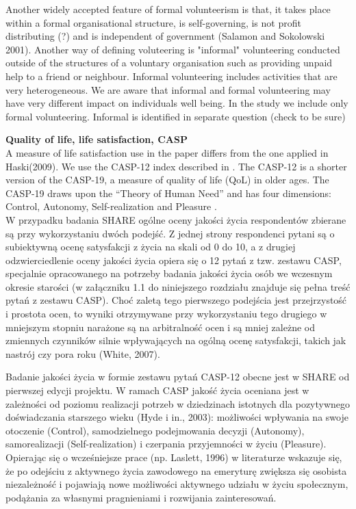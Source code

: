\documentclass[10pt, letterpaper]{article}
\begin{document}
\begin{spacing}{1.4}
Another widely accepted feature of formal volunteerism is that, it takes place within a formal organisational structure, is self-governing, is not profit distributing (?) and is independent of government (Salamon and Sokolowski 2001). Another way of defining voluteering is "informal" volunteering conducted outside of the structures of a voluntary organisation such as providing unpaid help to a friend or neighbour. Informal volunteering includes activities that are very heterogeneous. We are aware that informal and formal volunteering may have very different impact on individuals well being. In the study we include only formal volunteering. Informal is identified in separate question (check to be sure)

\textbf{Quality of life, life satisfaction, CASP} \\
A measure of life satisfaction use in the paper differs from the one applied in Haski(2009). We use the CASP-12 index described in \cite{hyde03}. The CASP-12 is a shorter version of the CASP-19, a measure of quality of life (QoL) in older ages. The CASP-19 draws upon the “Theory of Human Need” and has four dimensions: Control, Autonomy, Self-realization and Pleasure \citep{borrat15}.\\

W przypadku badania SHARE ogólne oceny jakości życia respondentów zbierane są przy wykorzystaniu dwóch podejść. Z jednej strony respondenci pytani są o subiektywną ocenę satysfakcji z życia na skali od 0 do 10, a z drugiej odzwierciedlenie oceny jakości życia opiera się o 12 pytań z tzw. zestawu CASP, specjalnie opracowanego na potrzeby badania jakości życia osób we wczesnym okresie starości (w załączniku 1.1 do niniejszego rozdziału znajduje się pełna treść pytań z zestawu CASP). Choć zaletą tego pierwszego podejścia jest przejrzystość i prostota ocen, to wyniki otrzymywane przy wykorzystaniu tego drugiego w mniejszym stopniu narażone są na arbitralność ocen i są mniej zależne od zmiennych czynników silnie wpływających na ogólną ocenę satysfakcji, takich jak nastrój czy pora roku (White, 2007). 

Badanie jakości życia w formie zestawu pytań CASP-12 obecne jest w SHARE od pierwszej edycji projektu. W ramach CASP jakość życia oceniana jest w zależności od poziomu realizacji potrzeb w dziedzinach istotnych dla pozytywnego doświadczania starszego wieku (Hyde i in., 2003): możliwości wpływania na swoje otoczenie (Control), samodzielnego podejmowania decyzji (Autonomy), samorealizacji (Self-realization) i czerpania przyjemności w życiu (Pleasure).  Opierając się o wcześniejsze prace (np. Laslett, 1996) w literaturze wskazuje się, że po odejściu z aktywnego życia zawodowego na emeryturę zwiększa się osobista niezależność i pojawiają nowe możliwości aktywnego udziału w życiu społecznym, podążania za własnymi pragnieniami i rozwijania zainteresowań. 


\end{spacing}
\end{document}
